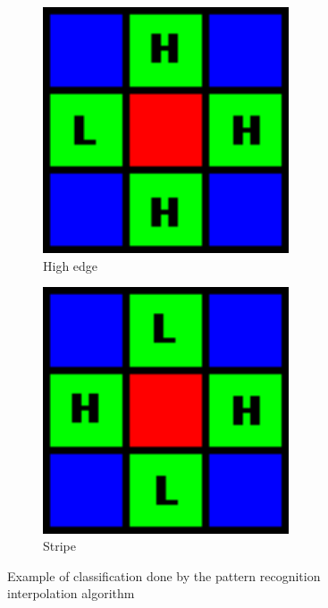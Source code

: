 \documentclass[a4paper,oneside]{article}
\begin{document}
\begin{figure}[htbp]
\begin{subfigure}{0.2\textwidth}
    \centering
    \includegraphics[width=0.8\textwidth]{include_imgs/pri_highedge}
    \caption{High edge}
    \label{fig:highedge}
  \end{subfigure}%
  \begin{subfigure}{0.2\textwidth}
    \centering
    \includegraphics[width=0.8\textwidth]{include_imgs/pri_stripe}
    \caption{Stripe}
    \label{fig:stripe}
  \end{subfigure}
  \caption{Example of classification done by the pattern recognition
    interpolation algorithm}
\end{figure}
\end{document}
